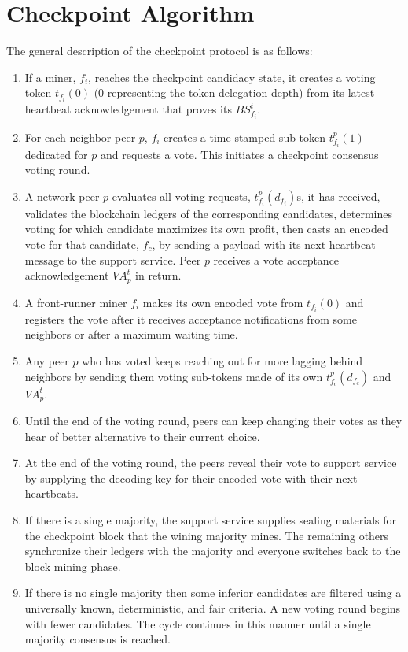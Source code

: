 \section{Checkpoint Algorithm}
\label{s-algorithm}
The general description of the checkpoint protocol is as follows:
\begin{enumerate}
\item If a miner, $f_i$, reaches the checkpoint candidacy state, it creates a voting token $t_{f_i}(0)$ (0 representing the token delegation depth) from its latest heartbeat acknowledgement that proves its  $BS_{f_i}^t$.
\item For each neighbor peer $p$, $f_i$ creates a time-stamped sub-token $t_{f_i}^{p}(1)$ dedicated for $p$ and requests a vote. This initiates a checkpoint consensus voting round.
\item A network peer $p$ evaluates all voting requests, $t_{f_i}^{p}(d_{f_i})$s, it has received, validates the blockchain ledgers of the corresponding candidates, determines voting for which candidate maximizes its own profit, then casts an encoded vote for that candidate, $f_c$, by sending a payload with its next heartbeat message to the support service. Peer $p$ receives a vote acceptance acknowledgement $VA_p^t$ in return.
\item A front-runner miner $f_i$ makes its own encoded vote from $t_{f_i}(0)$ and registers the vote after it receives acceptance notifications from some neighbors or after a maximum waiting time.
\item Any peer $p$ who has voted keeps reaching out for more lagging behind neighbors by sending them voting sub-tokens made of its own $t_{f_c}^{p}(d_{f_c})$ and $VA_p^t$.
\item Until the end of the voting round, peers can keep changing their votes as they hear of better alternative to their current choice.   
\item At the end of the voting round, the peers reveal their vote to support service by supplying the decoding key for their encoded vote with their next heartbeats.
\item If there is a single majority, the support service supplies sealing materials for the checkpoint block that the wining majority mines. The remaining others synchronize their ledgers with the majority and everyone switches back to the block mining phase.
\item If there is no single majority then some inferior candidates are filtered using a universally known, deterministic, and fair criteria. A new voting round begins with fewer candidates. The cycle continues in this manner until a single majority consensus is reached.                              
\end{enumerate}

